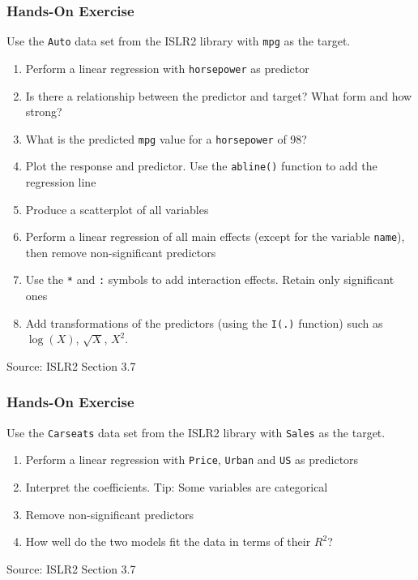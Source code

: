 \begin{tcolorbox}[colback=code]
\subsubsection*{Hands-On Exercise} 
\noindent Use the \texttt{Auto} data set from the ISLR2 library with \texttt{mpg} as the target.
  \begin{enumerate}
     \item Perform a linear regression with \texttt{horsepower} as predictor
     \item Is there a relationship between the predictor and target? What form and how strong?
     \item What is the predicted \texttt{mpg} value for a \texttt{horsepower} of 98? 
     \item Plot the response and predictor. Use the \texttt{abline()} function to add the regression line
     \item Produce a scatterplot of all variables
     \item Perform a linear regression of all main effects (except for the variable \texttt{name}), then remove non-significant predictors
     \item Use the \texttt{*} and \texttt{:} symbols to add interaction effects. Retain only significant ones
     \item Add transformations of the predictors (using the \texttt{I(.)} function) such as $\log(X)$, $\sqrt{X}$, $X^2$.
  \end{enumerate}

{\footnotesize \vspace{\baselineskip} Source: ISLR2 Section 3.7}
\end{tcolorbox}

\begin{tcolorbox}[colback=code]
\subsubsection*{Hands-On Exercise} 
\noindent Use the \texttt{Carseats} data set from the ISLR2 library with \texttt{Sales} as the target.
  \begin{enumerate}
     \item Perform a linear regression with \texttt{Price}, \texttt{Urban} and \texttt{US} as predictors
     \item Interpret the coefficients. Tip: Some variables are categorical
     \item Remove non-significant predictors
     \item How well do the two models fit the data in terms of their $R^2$?
  \end{enumerate}

{\footnotesize \vspace{\baselineskip} Source: ISLR2 Section 3.7}
\end{tcolorbox}

